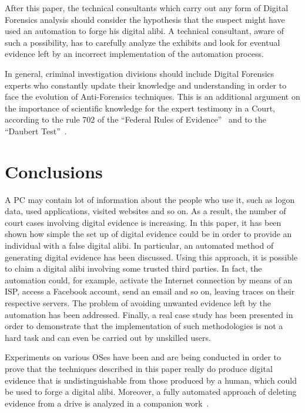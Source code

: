 \documentclass[runningheads]{llncs}
\begin{document}
After this paper, the technical consultants which carry out any form of Digital Forensics analysis should consider the hypothesis that the suspect might have used an automation to forge his digital alibi. A technical consultant, aware of such a possibility, has to carefully analyze the exhibits and look for eventual evidence left by an incorrect implementation of the automation process.

In general, criminal investigation divisions should include Digital Forensics experts who constantly update their knowledge and understanding in order to face the evolution of Anti-Forensics techniques.
This is an additional argument on the importance of scientific knowledge for the expert testimony in a Court, according to the rule 702 of the ``Federal Rules of Evidence''~\cite{rule702} and to the ``Daubert Test''~\cite{daubert}. 


\section{Conclusions}
\label{sec:conc}

A PC may contain lot of information about the people who use it, such as logon data, used applications, visited websites and so on. As a result, the number of court cases involving digital evidence is increasing.
In this paper, it has been shown how simple the set up of digital evidence could be in order to provide an individual with a false digital alibi. In particular, an automated method of generating digital evidence has been discussed. Using this approach, it is possible to claim a digital alibi involving some trusted third parties. In fact, the automation could, for example, activate the Internet connection by means of an ISP, access a Facebook account, send an email and so on, leaving traces on their respective servers. The problem of avoiding unwanted evidence left by the automation has been addressed. Finally, a real case study has been presented in order to demonstrate that the implementation of such methodologies is not a hard task and can even be carried out by unskilled users.

Experiments on various OSes have been and are being conducted in order to prove that the techniques described in this paper really do produce digital evidence that is undistinguishable from those produced by a human, which could be used to forge a digital alibi. Moreover, a fully automated approach of deleting evidence from a drive is analyzed in a companion work~\cite{cancellazione}.
\end{document}
